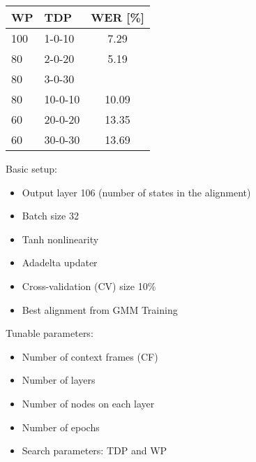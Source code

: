 \documentclass[11pt, a4paper, landscape]{article}
\begin{document}
\begin{center}
	\begin{tabular}{| l | l | c |} \toprule
		WP  &  TDP      &    WER [\%]     \\ \midrule
		100 &  1-0-10   &    7.29         \\
		80  &  2-0-20   &    5.19         \\
		80  &  3-0-30   &\color{red}{4.70}\\ \midrule
		80  &  10-0-10  &    10.09        \\
		60  &  20-0-20  &    13.35        \\
		60  &  30-0-30  &    13.69        \\ \bottomrule		
	\end{tabular}
\end{center}
%
\vfill

\NewPage{}
Basic setup:
\begin{itemize}
  \item Output layer 106 (number of states in the alignment)
  \item Batch size 32 
  \item Tanh nonlinearity
  \item Adadelta updater
  \item Cross-validation (CV) size 10\%
  \item Best alignment from GMM Training
\end{itemize}
\vspace{20pt}
Tunable parameters:
\begin{itemize}
	\item Number of context frames (CF)
	\item Number of layers
	\item Number of nodes on each layer
	\item Number of epochs
	\item Search parameters: TDP and WP
\end{itemize}
\end{document}
